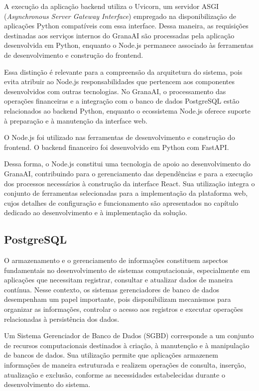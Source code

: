 A execução da aplicação backend utiliza o Uvicorn, um servidor ASGI (\textit{Asynchronous Server Gateway Interface}) empregado na disponibilização de aplicações Python compatíveis com essa interface. Dessa maneira, as requisições destinadas aos serviços internos do GranaAI são processadas pela aplicação desenvolvida em Python, enquanto o Node.js permanece associado às ferramentas de desenvolvimento e construção do frontend.

Essa distinção é relevante para a compreensão da arquitetura do sistema, pois evita atribuir ao Node.js responsabilidades que pertencem aos componentes desenvolvidos com outras tecnologias. No GranaAI, o processamento das operações financeiras e a integração com o banco de dados PostgreSQL estão relacionados ao backend Python, enquanto o ecossistema Node.js oferece suporte à preparação e à manutenção da interface web.

O Node.js foi utilizado nas ferramentas de desenvolvimento e construção do frontend. O backend financeiro foi desenvolvido em Python com FastAPI.

Dessa forma, o Node.js constitui uma tecnologia de apoio ao desenvolvimento do GranaAI, contribuindo para o gerenciamento das dependências e para a execução dos processos necessários à construção da interface React. Sua utilização integra o conjunto de ferramentas selecionadas para a implementação da plataforma web, cujos detalhes de configuração e funcionamento são apresentados no capítulo dedicado ao desenvolvimento e à implementação da solução.

\subsection{PostgreSQL}

O armazenamento e o gerenciamento de informações constituem aspectos fundamentais no desenvolvimento de sistemas computacionais, especialmente em aplicações que necessitam registrar, consultar e atualizar dados de maneira contínua. Nesse contexto, os sistemas gerenciadores de banco de dados desempenham um papel importante, pois disponibilizam mecanismos para organizar as informações, controlar o acesso aos registros e executar operações relacionadas à persistência dos dados.

Um Sistema Gerenciador de Banco de Dados (SGBD) corresponde a um conjunto de recursos computacionais destinados à criação, à manutenção e à manipulação de bancos de dados. Sua utilização permite que aplicações armazenem informações de maneira estruturada e realizem operações de consulta, inserção, atualização e exclusão, conforme as necessidades estabelecidas durante o desenvolvimento do sistema.

